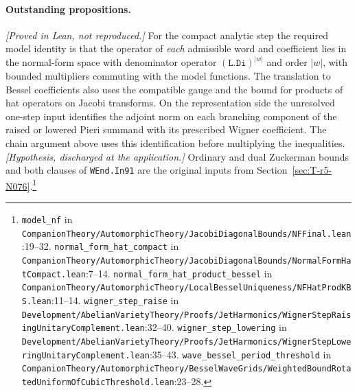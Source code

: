 \paragraph{Outstanding propositions.}
\textit{[Proved in Lean, not reproduced.]} For the compact analytic step the required model identity is that the operator of \emph{each} admissible word and coefficient lies in the normal-form space with denominator operator $(\texttt{L.Di})^{|w|}$ and order $|w|$, with bounded multipliers commuting with the model functions. The translation to Bessel coefficients also uses the compatible gauge and the bound for products of hat operators on Jacobi transforms. On the representation side the unresolved one-step input identifies the adjoint norm on each branching component of the raised or lowered Pieri summand with its prescribed Wigner coefficient. The chain argument above uses this identification before multiplying the inequalities. \textit{[Hypothesis, discharged at the application.]} Ordinary and dual Zuckerman bounds and both clauses of \nolinkurl{WEnd.In91} are the original inputs from Section~\ref{sec:T-r5-N076}.\footnote{\nolinkurl{model_nf} in \nolinkurl{CompanionTheory/AutomorphicTheory/JacobiDiagonalBounds/NFFinal.lean}\allowbreak:19--32. \nolinkurl{normal_form_hat_compact} in \nolinkurl{CompanionTheory/AutomorphicTheory/JacobiDiagonalBounds/NormalFormHatCompact.lean}\allowbreak:7--14. \nolinkurl{normal_form_hat_product_bessel} in \nolinkurl{CompanionTheory/AutomorphicTheory/LocalBesselUniqueness/NFHatProdKBS.lean}\allowbreak:11--14. \nolinkurl{wigner_step_raise} in \nolinkurl{Development/AbelianVarietyTheory/Proofs/JetHarmonics/WignerStepRaisingUnitaryComplement.lean}\allowbreak:32--40. \nolinkurl{wigner_step_lowering} in \nolinkurl{Development/AbelianVarietyTheory/Proofs/JetHarmonics/WignerStepLoweringUnitaryComplement.lean}\allowbreak:35--43. \nolinkurl{wave_bessel_period_threshold} in \nolinkurl{CompanionTheory/AutomorphicTheory/BesselWaveGrids/WeightedBoundRotatedUniformOfCubicThreshold.lean}\allowbreak:23--28.}

